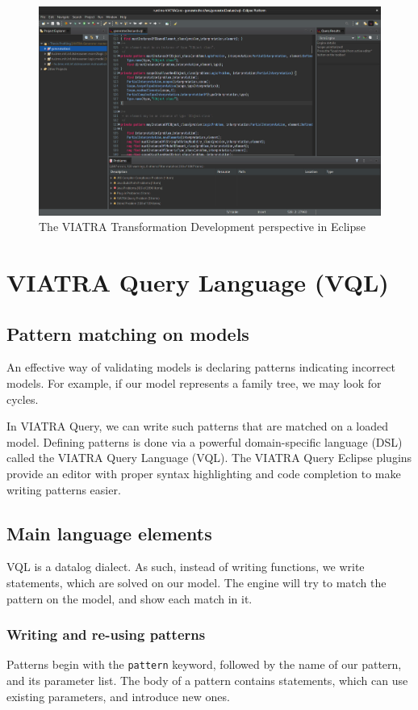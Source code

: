 \documentclass[11pt,a4paper,oneside]{report}
\begin{document}
\begin{figure}[ht]
\centering
\includegraphics[width=150mm, keepaspectratio]{figures/eclipse-viatra.png}
\caption{The VIATRA Transformation Development perspective in Eclipse}
\label{fig:eclipse-viatra}
\end{figure}

\section{VIATRA Query Language (VQL)}
\subsection{Pattern matching on models}
An effective way of validating models is declaring patterns indicating incorrect
models. For example, if our model represents a family tree, we may look for
cycles.

In VIATRA Query, we can write such patterns that are matched on a loaded model.
Defining patterns is done via a powerful domain-specific language (DSL) called
the VIATRA Query Language (VQL). The VIATRA Query Eclipse plugins provide an
editor with proper syntax highlighting and code completion to make writing
patterns easier.

\subsection{Main language elements}
VQL is a datalog dialect. As such, instead of writing functions, we write
statements, which are solved on our model. The engine will try to match the
pattern on the model, and show each match in it.

\subsubsection{Writing and re-using patterns}
Patterns begin with the \texttt{pattern} keyword, followed by the name of our
pattern, and its parameter list. The body of a pattern contains statements,
which can use existing parameters, and introduce new ones.
\end{document}
